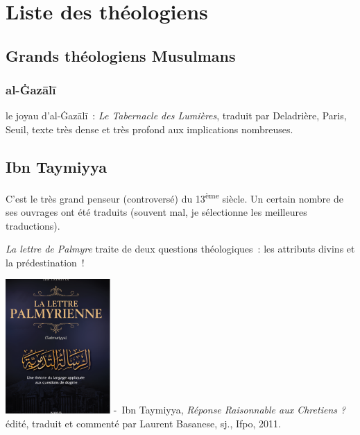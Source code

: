 \chapter{Liste des théologiens}

\section{Grands théologiens Musulmans}


\subsection{al-Ġazālī}

le joyau d'al-Ġazālī~: \emph{Le Tabernacle des Lumières}, traduit
par Deladrière, Paris, Seuil, texte très dense et très profond aux
implications nombreuses.
\pageref{theol:AlGazali29}
\pageref{theol:AlGazali2}
\pageref{theol:AlGazali3}
\pageref{theol:AlGazali8}
\pageref{theol:AlGazali25}
\section{Ibn Taymiyya}


 

C'est le très grand penseur (controversé) du 13\textsuperscript{ème}
siècle. Un certain nombre de ses ouvrages ont été traduits (souvent mal,
je sélectionne les meilleures traductions).


\emph{La lettre de Palmyre} traite de deux questions théologiques~: les
attributs divins et la prédestination~!

\includegraphics[width=0.3\textwidth]{Images/image026.png}
-~Ibn Taymiyya, \emph{Réponse Raisonnable aux Chretiens ?} édité,
traduit et commenté par Laurent Basanese, sj., Ifpo, 2011.

